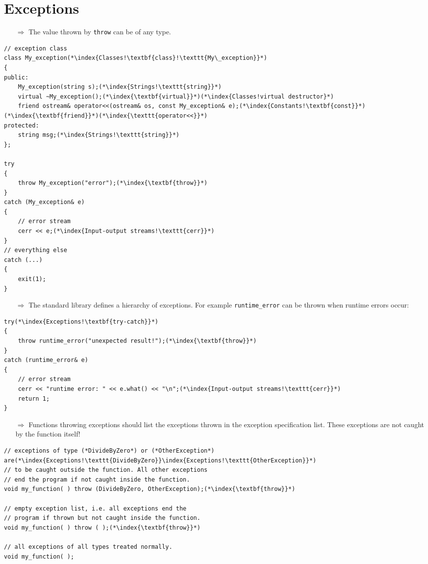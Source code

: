\documentclass[10pt]{article}
\begin{document}
\section{Exceptions}
\small
\begin{enumerate}
\item[$\Rightarrow$] The value thrown by
\texttt{throw} can be of any type.
\end{enumerate}
\begin{lstlisting}
// exception class
class My_exception(*\index{Classes!\textbf{class}!\texttt{My\_exception}}*)
{
public:
    My_exception(string s);(*\index{Strings!\texttt{string}}*)
    virtual ~My_exception();(*\index{\textbf{virtual}}*)(*\index{Classes!virtual destructor}*)
    friend ostream& operator<<(ostream& os, const My_exception& e);(*\index{Constants!\textbf{const}}*)(*\index{\textbf{friend}}*)(*\index{\texttt{operator<<}}*)
protected:
    string msg;(*\index{Strings!\texttt{string}}*)
};

try
{
    throw My_exception("error");(*\index{\textbf{throw}}*)
}
catch (My_exception& e)
{
    // error stream
    cerr << e;(*\index{Input-output streams!\texttt{cerr}}*)
}
// everything else
catch (...)
{
    exit(1);
}
\end{lstlisting}
\begin{enumerate}
\item[$\Rightarrow$] The standard library defines a hierarchy of exceptions.  For example \texttt{runtime\_error} can be 
thrown when runtime errors occur:
\end{enumerate}
\begin{lstlisting}
try(*\index{Exceptions!\textbf{try-catch}}*)
{
    throw runtime_error("unexpected result!");(*\index{\textbf{throw}}*)
}
catch (runtime_error& e)
{
    // error stream
    cerr << "runtime error: " << e.what() << "\n";(*\index{Input-output streams!\texttt{cerr}}*)
    return 1;
}
\end{lstlisting}
\begin{enumerate}
\item[$\Rightarrow$] Functions throwing exceptions should list the exceptions thrown in
the exception specification list. These exceptions are not 
caught by the function itself!
\end{enumerate}
\begin{lstlisting}
// exceptions of type (*DivideByZero*) or (*OtherException*) are(*\index{Exceptions!\texttt{DivideByZero}}\index{Exceptions!\texttt{OtherException}}*)
// to be caught outside the function. All other exceptions 
// end the program if not caught inside the function.
void my_function( ) throw (DivideByZero, OtherException);(*\index{\textbf{throw}}*)

// empty exception list, i.e. all exceptions end the
// program if thrown but not caught inside the function.
void my_function( ) throw ( );(*\index{\textbf{throw}}*)

// all exceptions of all types treated normally.
void my_function( );
\end{lstlisting}
\end{document}
